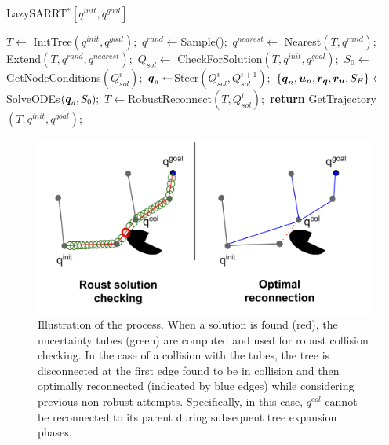 \begin{algorithm}[h!]
    \caption{LazySARRT$^* [q^{init}, q^{goal}]$}\label{alg:LazySARRT*}
    \begin{algorithmic}[1]
        \State $T \gets$ InitTree$({q^{init}, q^{goal}});$
            \State $q^{rand} \gets $Sample()$;$
            \State $q^{nearest} \gets$ Nearest$(T,{q^{rand}});$
            \State Extend$(T, q^{rand}, q^{nearest});$
            \State $Q_{sol} \gets$ CheckForSolution$(T, q^{init}, q^{goal});$
                    \State $S_0 \gets $GetNodeConditions$(Q_{sol}^{i});$
                    \State $\boldsymbol{q}_d \gets $Steer$(Q_{sol}^{i}, Q_{sol}^{i+1});$
                    \State $\left \{\boldsymbol{q}_n, \boldsymbol{u}_n, \boldsymbol{r_q}, \boldsymbol{r_u}, S_F \right \}  \gets $SolveODEs$(\boldsymbol{q}_d, S_0);$
                        \State $T \gets $RobustReconnect$(T, Q_{sol}^{i});$
                    \EndIf
                \EndFor
            \EndIf
        \EndWhile
        \State \textbf{return} GetTrajectory$(T, q^{init}, q^{goal})$;
    \end{algorithmic}
\end{algorithm}

\begin{figure} [h!]
    \centering
    \includegraphics[width=0.8\linewidth]{figures/samp/lazyrrtstar.png} 
    \caption{Illustration of the  process.
    When a solution is found (red), the uncertainty tubes (green) are computed and used for robust collision checking.
    In the case of a collision with the tubes, the tree is disconnected at the first edge found to be in collision and then optimally reconnected (indicated by blue edges) while considering previous non-robust attempts. 
    Specifically, in this case, $q^{col}$ cannot be reconnected to its parent during subsequent tree expansion phases.
    }%
    \label{fig:lazysarrt*}%
\end{figure}

